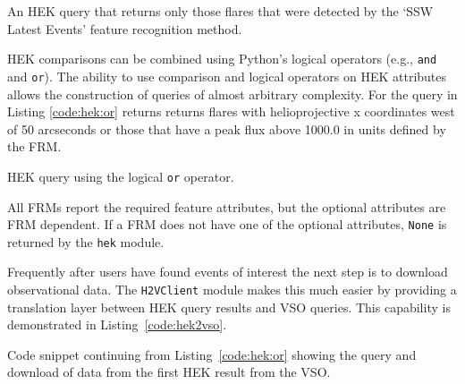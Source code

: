 \begin{listing}[H]
\caption{An HEK query that returns only those flares that were
  detected by the `SSW Latest Events' feature recognition method.}
\label{code:hek:frm}
\end{listing}

HEK comparisons can be combined using Python's logical operators (e.g., \texttt{and}
and \texttt{or}). The ability to use comparison and logical operators on HEK attributes allows 
the construction of queries of almost arbitrary complexity.
For the query in Listing \ref{code:hek:or} returns
returns flares with helioprojective x coordinates west of 50 arcseconds or 
those that have a peak flux above 1000.0 in units defined by the FRM.

\begin{listing}[H]
\caption{HEK query using the logical \texttt{or} operator.}
\label{code:hek:or}
\end{listing}
All FRMs report the required feature attributes, but the optional attributes 
are FRM dependent.  If a FRM does not have one of the optional attributes, 
\texttt{None} is returned by the \texttt{hek} module. 
 
Frequently after users have found events of interest the next step is to 
download observational data. The \texttt{H2VClient} module makes this
much easier by providing a translation layer between HEK query results
and VSO queries. This capability is demonstrated in Listing~\ref{code:hek2vso}.
\begin{listing}[H]
\caption{Code snippet continuing from Listing~\ref{code:hek:or} showing the 
query and download of data from the first HEK result from the VSO.}
\label{code:hek2vso}
\end{listing}